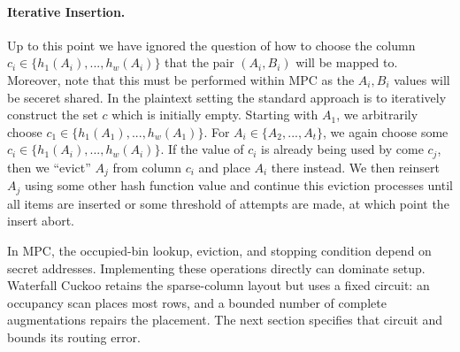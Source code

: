 \paragraph{Iterative Insertion.} Up to this point we have ignored the question of how to choose the column $c_i\in\{h_1(A_i),...,h_w(A_i)\}$ that the pair $(A_i,B_i)$ will be mapped to. Moreover, note that this must be performed within MPC as the $A_i,B_i$ values will be seceret shared. In the plaintext setting the standard approach is to iteratively construct the set $c$ which is initially empty. Starting with $A_1$, we arbitrarily choose $c_1\in\{h_1(A_1),...,h_w(A_1)\}$. For $A_i\in \{A_2,...,A_t\}$, we again choose some $c_i\in\{h_1(A_i),...,h_w(A_i)\}$. If the value of $c_i$ is already being used by come $c_j$, then we ``evict'' $A_j$ from column $c_i$ and place $A_i$ there instead. We then reinsert $A_j$ using some other hash function value and continue this eviction processes until all items are inserted or some threshold of attempts are made, at which point the insert abort. 

In MPC, the occupied-bin lookup, eviction, and stopping condition depend on
secret addresses. Implementing these operations directly can dominate setup.
Waterfall Cuckoo retains the sparse-column layout but uses a fixed circuit:
an occupancy scan places most rows, and a bounded number of complete
augmentations repairs the placement. The next section specifies that circuit
and bounds its routing error.
